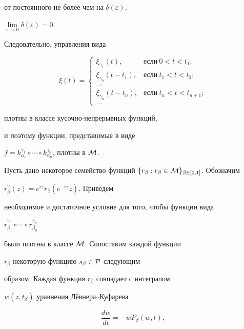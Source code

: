 от постоянного не более чем на $\delta(\varepsilon)$,


$\lim\limits_{\varepsilon\to0}\delta(\varepsilon)=0$.


Следовательно, управления вида


$$


\xi(t)=


\begin{cases}


\xi_{\gamma_1}(t), & \text{если}\ 0<t<t_1;\\


\xi_{\gamma_2}(t-t_1), & \text{если}\ t_1<t<t_2;\\


\dotsc\\


\xi_{\gamma_n}(t-t_n), & \text{если}\ t_n<t<t_{n+1};\\


\dotsc


\end{cases}


$$


плотны в классе кусочно-непрерывных функций, 


и поэтому функции, представимые в виде


$f=k_{\alpha_1}^{\gamma_1}\circ\dotsb\circ


k_{\alpha_n}^{\gamma_n}$, плотны в $\cal M$.





Пусть дано некоторое семейство функций $\{r_\beta:r_\beta\in{\cal


M}\}_{\beta\in[0,1]}$. Обозначим 


$r_\beta^\gamma(z)=e^{i\gamma}r_\beta(e^{-i\gamma}z)$. Приведем


необходимое и достаточное условие для того, чтобы функции вида


$r_{\beta_1}^{\gamma_1}\circ\dotsb\circ r_{\beta_n}^{\gamma_n}$


были плотны в классе $\cal M$. Сопоставим каждой функции


$r_\beta$ некоторую функцию $s_\beta\in\cal P$ следующим


образом. Каждая функция $r_\beta$ совпадает с интегралом


$w(z,t_\beta)$ уравнения Л\"евнера--Куфарева


\begin{equation}


\label{kufaref} \frac{dw}{dt}=-w P_\beta(w,t),


\end{equation}


